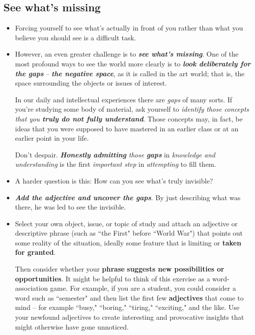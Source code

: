 \documentclass[11pt]{article}
\begin{document}
\subsection{See what's missing}
\begin{itemize}
\item Forcing yourself to see what’s actually in front of you rather than what you believe you should see is a difficult task. 

\item However, an even greater challenge is to \emph{\textbf{see what’s missing}}. One of the most profound ways to see the world more clearly is to \emph{\textbf{look deliberately for the gaps}} -- \emph{\textbf{the negative space}}, as it is called in the art world; that is, the space surrounding the objects or issues of interest. 

In our daily and intellectual experiences there are \emph{gaps} of many sorts. If you’re studying some body of material, ask yourself to \emph{identify those concepts that you \textbf{truly do not fully understand}}. Those concepts may, in fact, be ideas that you were supposed to have mastered in an earlier class or at an earlier point in your life.

Don’t despair. \emph{\textbf{Honestly admitting} those \textbf{gaps}} in \emph{knowledge and understanding} is the first \emph{important step} in \emph{attempting} to fill them. 

\item A harder question is this: How can you see what’s truly invisible?

\item \emph{\textbf{Add the adjective and uncover the gaps}}. By just describing what was there, he was led to see the invisible.

\item \begin{exercise}
Select your own object, issue, or topic of study and attach an adjective or descriptive phrase (such as ``the First" before ``World War") that points out some reality of the situation, ideally some feature that is limiting or \textbf{taken for granted}. 

Then consider whether your \textbf{phrase} \textbf{suggests new possibilities or opportunities}. It might be helpful to think of this exercise as a word-association game. For example, if you are a student, you could consider a word such as ``semester" and then list the first few \textbf{adjectives} that come to mind -- for example ``busy," ``boring," ``tiring," ``exciting," and the like. Use your newfound
adjectives to create interesting and provocative insights that might otherwise have gone unnoticed.
\end{exercise}


\end{itemize}
\end{document}
